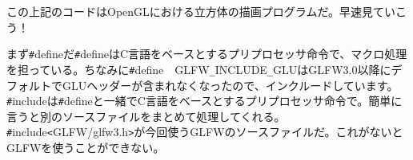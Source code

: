 \documentclass[12pt,a4paper]{jsarticle}
\begin{document}
この上記のコードはOpenGLにおける立方体の描画プログラムだ。早速見ていこう！

まず\verb|#|defineだ\verb|#|defineはC言語をベースとするプリプロセッサ命令で、マクロ処理を担っている。ちなみに\verb|#|define　GLFW\verb|_|INCLUDE\verb|_|GLUはGLFW3.0以降にデフォルトでGLUヘッダーが含まれなくなったので、インクルードしています。
\verb|#|includeは\verb|#|defineと一緒でC言語をベースとするプリプロセッサ命令で。簡単に言うと別のソースファイルをまとめて処理してくれる。
\verb|#|include\verb|<|GLFW/glfw3.h\verb|>|が今回使うGLFWのソースファイルだ。これがないとGLFWを使うことができない。
\end{document}
